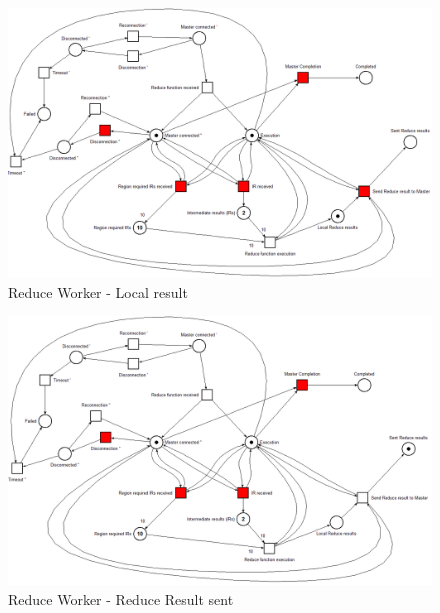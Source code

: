 \begin{figure}[!ht]
    \centering
    \includegraphics[width=\linewidth]{document/chapters/chapter_6/images/reduce_worker_petri_net_4.png}
    \caption{Reduce Worker - Local result}
    \label{fig:map_worker_petri_net_4}
\end{figure}

\begin{figure}[!ht]
    \centering
    \includegraphics[width=\linewidth]{document/chapters/chapter_6/images/reduce_worker_petri_net_5.png}
    \caption{Reduce Worker - Reduce Result sent}
    \label{fig:map_worker_petri_net_5}
\end{figure}

